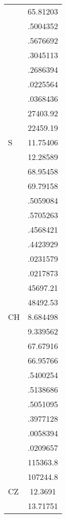 {\begin{tabular}{l*{1}{c}}
                    &    65.81203\\
                    &    .5004352\\
                    &    .5676692\\
                    &    .3045113\\
                    &    .2686394\\
                    &    .0225564\\
                    &    .0368436\\
                    &    27403.92\\
                    &    22459.19\\
S                   &    11.75406\\
                    &    12.28589\\
                    &    68.95458\\
                    &    69.79158\\
                    &    .5059084\\
                    &    .5705263\\
                    &    .4568421\\
                    &    .4423929\\
                    &    .0231579\\
                    &    .0217873\\
                    &    45697.21\\
                    &    48492.53\\
CH                  &    8.684498\\
                    &    9.339562\\
                    &    67.67916\\
                    &    66.95766\\
                    &    .5400254\\
                    &    .5138686\\
                    &    .5051095\\
                    &    .3977128\\
                    &    .0058394\\
                    &    .0209657\\
                    &    115363.8\\
                    &    107244.8\\
CZ                  &     12.3691\\
                    &    13.71751\\

\end{tabular}}
